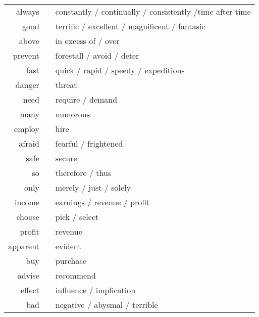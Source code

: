 \begin{tabular}{rc@{\quad$\to$\quad}l}
    always   &  & constantly / continually / consistently /time after time         \\
    good     &  & terrific / excellent / magnificent / fantasic                    \\
    above    &  & in excess of / over                                              \\
    prevent  &  & forestall / avoid / deter                                        \\
    fast     &  & quick / rapid / speedy / expeditious                             \\
    danger   &  & threat                                                           \\
    need     &  & require / demand                                                 \\
    many     &  & numorous                                                         \\
    employ   &  & hire                                                             \\
    afraid   &  & fearful / frightened                                             \\
    safe     &  & secure                                                           \\
    so       &  & therefore / thus                                                 \\
    only     &  & merely / just / solely                                           \\
    income   &  & earnings / revenue / profit                                      \\
    choose   &  & pick / select                                                    \\
    profit   &  & revenue                                                          \\
    apparent &  & evident                                                          \\
    buy      &  & purchase                                                         \\
    advise   &  & recommend                                                        \\
    effect   &  & influence / implication                                          \\
    bad      &  & negative / abysmal / terrible                                    \\

\end{tabular}

